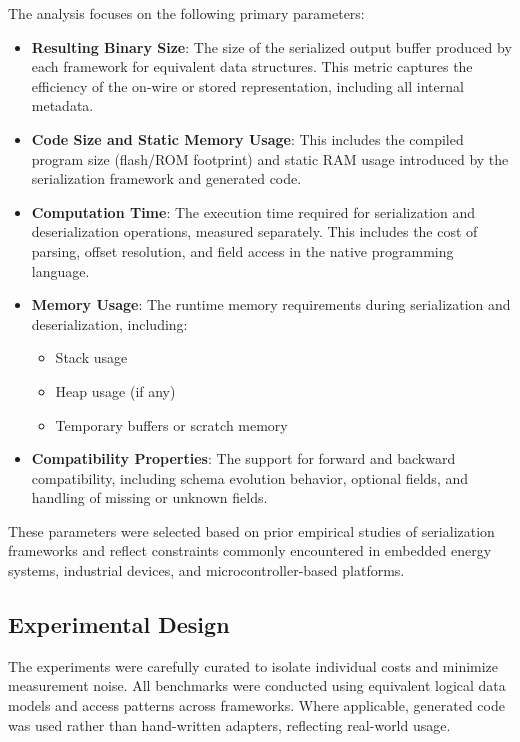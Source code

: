 \documentclass[11pt, a4paper]{article}
\begin{document}
The analysis focuses on the following primary parameters:

\begin{itemize}
    \item \textbf{Resulting Binary Size}: The size of the serialized output buffer produced by each framework for equivalent data structures. This metric captures the efficiency of the on-wire or stored representation, including all internal metadata.

    \item \textbf{Code Size and Static Memory Usage}: This includes the compiled program size (flash/ROM footprint) and static RAM usage introduced by the serialization framework and generated code.

    \item \textbf{Computation Time}: The execution time required for serialization and deserialization operations, measured separately. This includes the cost of parsing, offset resolution, and field access in the native programming language.

    \item \textbf{Memory Usage}: The runtime memory requirements during serialization and deserialization, including:
          \begin{itemize}
              \item Stack usage
              \item Heap usage (if any)
              \item Temporary buffers or scratch memory
          \end{itemize}

    \item \textbf{Compatibility Properties}: The support for forward and backward compatibility, including schema evolution behavior, optional fields, and handling of missing or unknown fields.
\end{itemize}

These parameters were selected based on prior empirical studies of serialization frameworks and reflect constraints commonly encountered in embedded energy systems, industrial devices, and microcontroller-based platforms.

\subsection{Experimental Design}

The experiments were carefully curated to isolate individual costs and minimize measurement noise. All benchmarks were conducted using equivalent logical data models and access patterns across frameworks. Where applicable, generated code was used rather than hand-written adapters, reflecting real-world usage.
\end{document}

